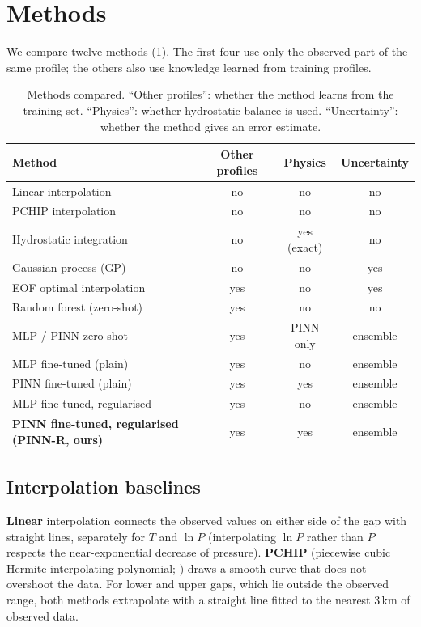 \documentclass[11pt,a4paper]{article}
\newcommand{\ours}{PINN-R}
\begin{document}
\section{Methods}\label{sec:methods}

We compare twelve methods (\cref{tab:methods}). The first four use only the observed part of the same profile; the others also use knowledge learned from training profiles.

\begin{table}[t]
\centering\small
\caption{Methods compared. ``Other profiles'': whether the method learns from the training set. ``Physics'': whether hydrostatic balance is used. ``Uncertainty'': whether the method gives an error estimate.}\label{tab:methods}
\begin{tabular}{p{5.2cm}ccc}
\toprule
Method & Other profiles & Physics & Uncertainty\\
\midrule
Linear interpolation & no & no & no\\
PCHIP interpolation & no & no & no\\
Hydrostatic integration & no & yes (exact) & no\\
Gaussian process (GP) & no & no & yes\\
EOF optimal interpolation & yes & no & yes\\
Random forest (zero-shot) & yes & no & no\\
MLP / PINN zero-shot & yes & PINN only & ensemble\\
MLP fine-tuned (plain) & yes & no & ensemble\\
PINN fine-tuned (plain) & yes & yes & ensemble\\
MLP fine-tuned, regularised & yes & no & ensemble\\
\textbf{PINN fine-tuned, regularised (\ours, ours)} & yes & yes & ensemble\\
\bottomrule
\end{tabular}
\end{table}

\subsection{Interpolation baselines}
\textbf{Linear} interpolation connects the observed values on either side of the gap with straight lines, separately for $T$ and $\ln P$ (interpolating $\ln P$ rather than $P$ respects the near-exponential decrease of pressure). \textbf{PCHIP} (piecewise cubic Hermite interpolating polynomial; \citealp{fritsch1980}) draws a smooth curve that does not overshoot the data. For lower and upper gaps, which lie outside the observed range, both methods extrapolate with a straight line fitted to the nearest 3\,km of observed data.
\end{document}
